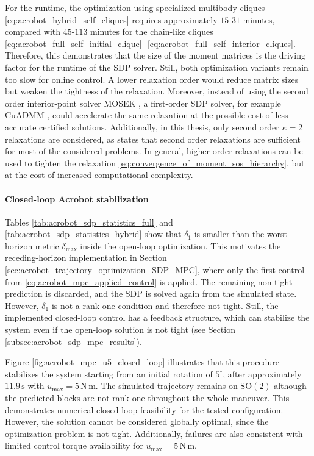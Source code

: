 For the runtime, the optimization using specialized multibody cliques \eqref{eq:acrobot_hybrid_self_cliques} 
requires approximately $15$-$31$ minutes,
compared with $45$-$113$ minutes for the chain-like cliques \eqref{eq:acrobot_full_self_initial_clique}-
\eqref{eq:acrobot_full_self_interior_cliques}.
Therefore, this demonstrates that the size of the moment matrices is the driving factor for the runtime of the SDP solver.
Still, both optimization variants remain too slow for online control.
A lower relaxation order would reduce matrix sizes but weaken the tightness of the relaxation.
Moreover, instead of using the second order interior-point solver MOSEK \cite{MOSEK}, 
a first-order SDP solver, for example CuADMM \cite{Kang_2026Fast}, could accelerate the same relaxation
at the possible cost of less accurate certified solutions. Additionally, in this thesis, only 
second order $\kappa = 2$ relaxations are considered, as \cite{Sangli2025}
states that second order relaxations are sufficient for most of the considered problems. In general, 
higher order relaxations can be used to tighten the relaxation \eqref{eq:convergence_of_moment_sos_hierarchy}, 
but at the cost of increased computational complexity.

\paragraph{Closed-loop Acrobot stabilization}
Tables \ref{tab:acrobot_sdp_statistics_full} and \ref{tab:acrobot_sdp_statistics_hybrid} 
show that $\delta_1$ is smaller than the worst-horizon metric $\delta_{\max}$ inside 
the open-loop optimization.
This motivates the receding-horizon implementation in Section 
\ref{sec:acrobot_trajectory_optimization_SDP_MPC}, where
only the first control from \eqref{eq:acrobot_mpc_applied_control} is applied.
The remaining non-tight prediction is discarded,
and the SDP is solved again from the simulated state.
However, $\delta_1$ is not a rank-one condition and therefore not tight.
Still, the implemented closed-loop control has a feedback structure, 
which can stabilize the system even if the open-loop solution is not tight 
(see Section \ref{subsec:acrobot_sdp_mpc_results}).

Figure \ref{fig:acrobot_mpc_u5_closed_loop} 
illustrates that this procedure stabilizes the system starting from an initial rotation of $5^\circ$,
after approximately $11.9\,\mathrm{s}$ with $u_{\max}=5\,\mathrm{N\,m}$.
The simulated trajectory remains on $\mathrm{SO}(2)$
although the predicted blocks are not rank one throughout the whole maneuver.
This demonstrates numerical closed-loop feasibility for the tested configuration.
However, the solution cannot be considered globally optimal, since the 
optimization problem is not tight. Additionally, failures are also 
consistent with limited control torque availability for $u_{\max}=5\,\mathrm{N\,m}$.

